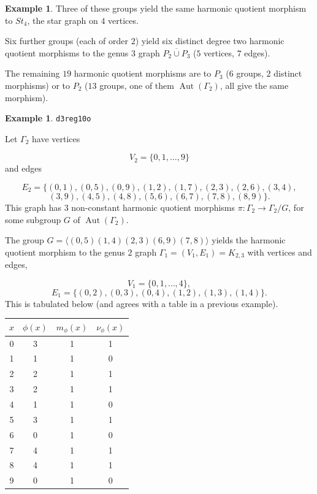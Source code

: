 \documentclass[12pt,letterpaper]{article}
\theoremstyle{definition}
\newtheorem{example}[theorem]{Example}
\DeclareMathOperator{\Aut}{Aut}
\begin{document}
\begin{example}
{Three of these groups yield the same harmonic quotient morphism to
$St_4$, the star graph on $4$ vertices.

Six further groups (each of order $2$) yield six distinct degree two
harmonic quotient morphisms to the genus $3$ graph $\overline{P_2\cup P_3}$
($5$ vertices, $7$ edges).

The remaining $19$ harmonic quotient morphisms are to $P_3$ ($6$ groups,
$2$ distinct morphisms) or to $P_2$ ($13$ groups, one of them $\Aut(\Gamma_2)$,
all give the same morphism).

}
\end{example}





\begin{example}%
\label{example:d3reg10o}
  {\tt d3reg10o}\newline
{\rm  
Let $\Gamma_2$ have vertices

\[
V_2=\{0,1,\dots,9\}
\]
and edges

\[
E_2 = \{
(0, 1), (0, 5), (0, 9), (1, 2), (1, 7), (2, 3), (2, 6), (3, 4),
\]
\[
(3, 9), (4, 5), (4, 8), (5, 6), (6, 7), (7, 8), (8, 9)
\}.
\]
This graph has $3$ non-constant harmonic quotient
morphisms $\pi: \Gamma_2\to \Gamma_2/G$, for some subgroup
$G$ of $\Aut(\Gamma_2)$.

The group $G = \langle (0,5)(1,4)(2,3)(6,9)(7,8) \rangle$ yields the
harmonic quotient morphism to the genus $2$ graph
$\Gamma_1 = (V_1,E_1) = K_{2,3}$
with vertices and edges,

\[
V_1=\{0,1,\dots, 4\},
\]
\[
E_1=\{
(0, 2), (0, 3), (0, 4), (1, 2), (1, 3), (1, 4)
\}.
\]
This is tabulated below (and agrees with a table in a previous example).

\begin{center}
\begin{tabular}{c|c|c|c}  
  $x$ & $\phi(x)$ & $m_\phi(x)$ & $\nu_\phi(x)$ \\ \hline
  0   &    3   &        1         &  1   \\ 
  1   &    1   &        1         &  0   \\ 
  2   &    2   &        1         &  1   \\ 
  3   &    2   &        1         &  1   \\ 
  4   &    1   &        1         &  0   \\ 
  5   &    3   &        1         &  1    \\ 
  6   &    0   &        1         &  0   \\ 
  7   &    4   &        1         &  1   \\
  8   &    4   &        1         &  1   \\
  9   &    0   &        1         &  0   \\ 
\end{tabular}
\end{center}

}
\end{example}
\end{document}
